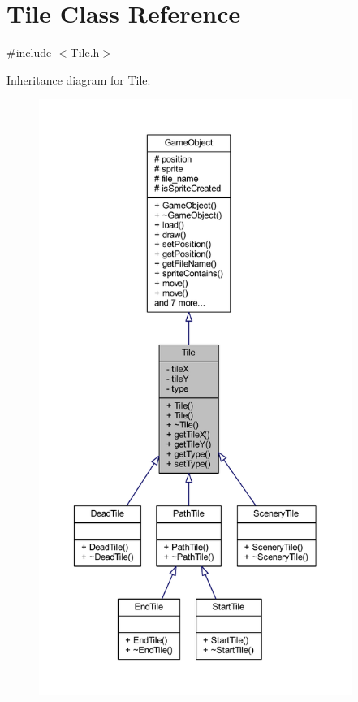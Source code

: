 \hypertarget{class_tile}{\section{Tile Class Reference}
\label{class_tile}
}


{\ttfamily \#include $<$Tile.\+h$>$}



Inheritance diagram for Tile\+:\nopagebreak
\begin{figure}[H]
\begin{center}
\leavevmode
\includegraphics[height=550pt]{class_tile__inherit__graph}
\end{center}
\end{figure}


